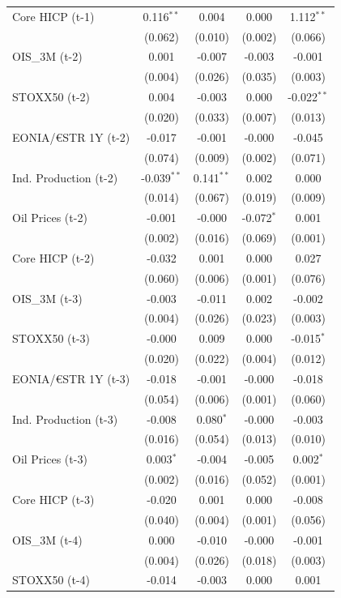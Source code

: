 \begin{longtable}[t]{lcccc}
Core HICP (t-1) & 0.116$^{**}$ & 0.004 & 0.000 & 1.112$^{**}$\\
 & (0.062) & (0.010) & (0.002) & (0.066)\\
OIS\_3M (t-2) & 0.001 & -0.007 & -0.003 & -0.001\\
 & (0.004) & (0.026) & (0.035) & (0.003)\\
STOXX50 (t-2) & 0.004 & -0.003 & 0.000 & -0.022$^{**}$\\
 & (0.020) & (0.033) & (0.007) & (0.013)\\
EONIA/€STR 1Y (t-2) & -0.017 & -0.001 & -0.000 & -0.045\\
 & (0.074) & (0.009) & (0.002) & (0.071)\\
Ind. Production (t-2) & -0.039$^{**}$ & 0.141$^{**}$ & 0.002 & 0.000\\
 & (0.014) & (0.067) & (0.019) & (0.009)\\
Oil Prices (t-2) & -0.001 & -0.000 & -0.072$^{*}$ & 0.001\\
 & (0.002) & (0.016) & (0.069) & (0.001)\\
Core HICP (t-2) & -0.032 & 0.001 & 0.000 & 0.027\\
 & (0.060) & (0.006) & (0.001) & (0.076)\\
OIS\_3M (t-3) & -0.003 & -0.011 & 0.002 & -0.002\\
 & (0.004) & (0.026) & (0.023) & (0.003)\\
STOXX50 (t-3) & -0.000 & 0.009 & 0.000 & -0.015$^{*}$\\
 & (0.020) & (0.022) & (0.004) & (0.012)\\
EONIA/€STR 1Y (t-3) & -0.018 & -0.001 & -0.000 & -0.018\\
 & (0.054) & (0.006) & (0.001) & (0.060)\\
Ind. Production (t-3) & -0.008 & 0.080$^{*}$ & -0.000 & -0.003\\
 & (0.016) & (0.054) & (0.013) & (0.010)\\
Oil Prices (t-3) & 0.003$^{*}$ & -0.004 & -0.005 & 0.002$^{*}$\\
 & (0.002) & (0.016) & (0.052) & (0.001)\\
Core HICP (t-3) & -0.020 & 0.001 & 0.000 & -0.008\\
 & (0.040) & (0.004) & (0.001) & (0.056)\\
OIS\_3M (t-4) & 0.000 & -0.010 & -0.000 & -0.001\\
 & (0.004) & (0.026) & (0.018) & (0.003)\\
STOXX50 (t-4) & -0.014 & -0.003 & 0.000 & 0.001\\

\end{longtable}
